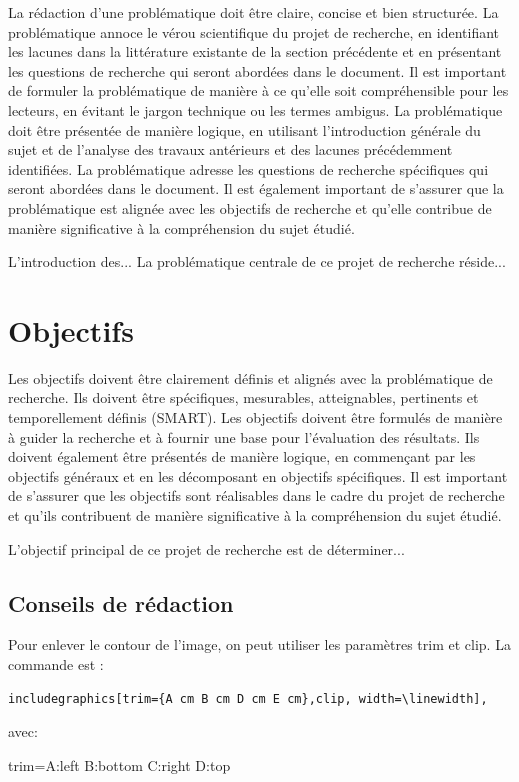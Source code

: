 La rédaction d'une problématique doit être claire, concise et bien structurée. La problématique annoce le vérou scientifique du projet de recherche, en identifiant les lacunes dans la littérature existante de la section précédente et en présentant les questions de recherche qui seront abordées dans le document. Il est important de formuler la problématique de manière à ce qu'elle soit compréhensible pour les lecteurs, en évitant le jargon technique ou les termes ambigus. La problématique doit être présentée de manière logique, en utilisant l'introduction générale du sujet et de l'analyse des travaux antérieurs et des lacunes précédemment identifiées. La problématique adresse les questions de recherche spécifiques qui seront abordées dans le document. Il est également important de s'assurer que la problématique est alignée avec les objectifs de recherche et qu'elle contribue de manière significative à la compréhension du sujet étudié.

L'introduction  des...
La problématique centrale de ce projet de recherche réside...


\section{Objectifs}
Les objectifs doivent être clairement définis et alignés avec la problématique de recherche. Ils doivent être spécifiques, mesurables, atteignables, pertinents et temporellement définis (SMART). Les objectifs doivent être formulés de manière à guider la recherche et à fournir une base pour l'évaluation des résultats. Ils doivent également être présentés de manière logique, en commençant par les objectifs généraux et en les décomposant en objectifs spécifiques. Il est important de s'assurer que les objectifs sont réalisables dans le cadre du projet de recherche et qu'ils contribuent de manière significative à la compréhension du sujet étudié. 

L'objectif principal de ce projet de recherche est de déterminer...

\subsection{Conseils de rédaction}

Pour enlever le contour de l'image, on peut utiliser les paramètres trim et clip. La commande est :\par

\begin{verbatim}
includegraphics[trim={A cm B cm D cm E cm},clip, width=\linewidth],
\end{verbatim}
avec: \par
trim=A:left B:bottom C:right D:top\par 

